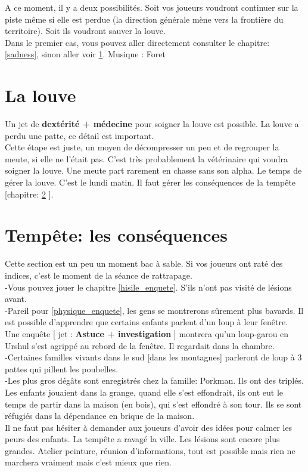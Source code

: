 \documentclass[oneside,12pt]{book}
\begin{document}
\begin{flushleft}
A ce moment, il y a deux possibilités. Soit vos joueurs voudront continuer sur la piste même si elle est perdue (la direction générale mène vers la frontière du territoire). Soit ils voudront sauver la louve.\\
Dans le premier cas, vous pouvez aller directement consulter le chapitre: \ref{sadness}, sinon aller voir \ref{louve}.
Musique : Foret 



\section{La louve}
\label{louve}
Un jet de \textbf{dextérité + médecine} pour soigner la louve est possible. 
La louve a perdu une patte, ce détail est important. \\ 
Cette étape est juste, un moyen de décompresser un peu et de regrouper la meute, si elle ne l'était pas. C'est très probablement la vétérinaire qui voudra soigner la louve. Une meute part rarement en chasse sans son alpha. Le temps de gérer la louve. C'est le lundi matin. Il faut gérer les conséquences de la tempête [chapitre: \ref{consequence} ]. \\


\section{Tempête: les conséquences}
\label{consequence}
Cette section est un peu un moment bac à sable. Si vos joueurs ont raté des indices, c'est le moment de la séance de rattrapage. \\
-Vous pouvez jouer le chapitre \ref{hisile_enquete}. S'ils n'ont pas visité de lésions avant.\\
-Pareil pour \ref{physique_enquete}, les gens se montrerons sûrement plus bavards. Il est possible d'apprendre que certains enfants parlent d'un loup à leur fenêtre. Une enquête [ jet : \textbf{Astuce + investigation} ] montrera qu'un loup-garou en Urshul s'est agrippé au rebord de la fenêtre. Il regardait dans la chambre.\\
-Certaines familles vivants dans le sud [dans les montagnes] parleront de loup à 3 pattes qui pillent les poubelles.\\
-Les plus gros dégâts sont enregistrés chez la famille: Porkman. Ils ont des triplés. Les enfants jouaient dans la grange, quand elle s'est effondrait, 
ils ont eut le temps de partir dans la maison (en bois), qui s'est effondré à son tour. Ils se sont réfugiés dans la dépendance en brique de la maison.\\
Il ne faut pas hésiter à demander aux joueurs d'avoir des idées pour calmer les peurs des enfants. La tempête a ravagé la ville. Les lésions sont encore plus grandes. Atelier peinture, réunion d'informations, tout est possible mais rien ne marchera vraiment mais c'est mieux que rien.


\end{flushleft}
\end{document}
